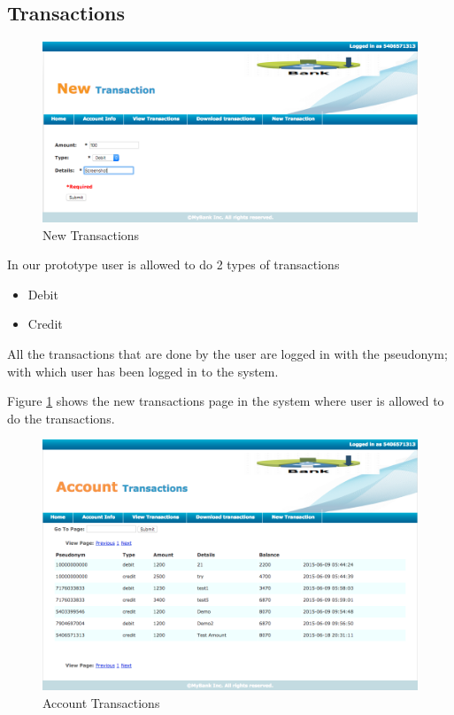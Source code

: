 \subsection{Transactions}
\begin{figure}
	\centering
	\includegraphics[width=\textwidth]{figures/New}
	\caption{New Transactions}
	\label{fig:New}
\end{figure}
In our prototype user is allowed to do 2 types of transactions
\begin{itemize}
	\item Debit
	\item Credit
\end{itemize}
All the transactions that are done by the user are logged in with the pseudonym; with which user has been logged in to the system.

Figure \ref{fig:New} shows the new transactions page in the system where user is allowed to do the transactions.
\begin{figure}[h]
	\centering
	\includegraphics[width=\textwidth]{figures/Transactions}
	\caption{Account Transactions}
	\label{fig:Transactions}
\end{figure}

